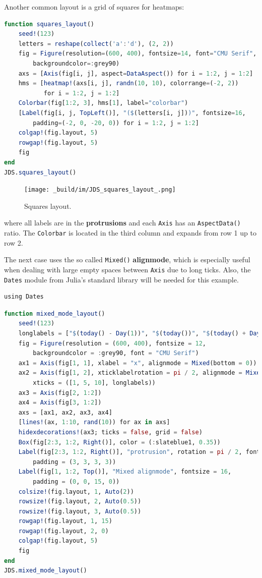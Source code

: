 \documentclass[
  notoc %
]{tufte-book}
\newcommand{\passthrough}[1]{#1}
\begin{document}
Another common layout is a grid of squares for heatmaps:

\begin{lstlisting}[language=Julia]
function squares_layout()
    seed!(123)
    letters = reshape(collect('a':'d'), (2, 2))
    fig = Figure(resolution=(600, 400), fontsize=14, font="CMU Serif",
        backgroundcolor=:grey90)
    axs = [Axis(fig[i, j], aspect=DataAspect()) for i = 1:2, j = 1:2]
    hms = [heatmap!(axs[i, j], randn(10, 10), colorrange=(-2, 2))
           for i = 1:2, j = 1:2]
    Colorbar(fig[1:2, 3], hms[1], label="colorbar")
    [Label(fig[i, j, TopLeft()], "($(letters[i, j]))", fontsize=16,
        padding=(-2, 0, -20, 0)) for i = 1:2, j = 1:2]
    colgap!(fig.layout, 5)
    rowgap!(fig.layout, 5)
    fig
end
JDS.squares_layout()
\end{lstlisting}

\begin{figure}
\hypertarget{fig:squares_layout}{%
\centering
\texttt{[image: \_build/im/JDS\_squares\_layout\_.png]}
\caption{Squares layout.}\label{fig:squares_layout}
}
\end{figure}

where all labels are in the \textbf{protrusions} and each
\passthrough{\lstinline!Axis!} has an
\passthrough{\lstinline!AspectData()!} ratio. The
\passthrough{\lstinline!Colorbar!} is located in the third column and
expands from row 1 up to row 2.

The next case uses the so called \passthrough{\lstinline!Mixed()!}
\textbf{alignmode}, which is especially useful when dealing with large
empty spaces between \passthrough{\lstinline!Axis!} due to long ticks.
Also, the \passthrough{\lstinline!Dates!} module from Julia's standard
library will be needed for this example.

\begin{lstlisting}
using Dates
\end{lstlisting}

\begin{lstlisting}[language=Julia]
function mixed_mode_layout()
    seed!(123)
    longlabels = ["$(today() - Day(1))", "$(today())", "$(today() + Day(1))"]
    fig = Figure(resolution = (600, 400), fontsize = 12,
        backgroundcolor = :grey90, font = "CMU Serif")
    ax1 = Axis(fig[1, 1], xlabel = "x", alignmode = Mixed(bottom = 0))
    ax2 = Axis(fig[1, 2], xticklabelrotation = pi / 2, alignmode = Mixed(bottom = 0),
        xticks = ([1, 5, 10], longlabels))
    ax3 = Axis(fig[2, 1:2])
    ax4 = Axis(fig[3, 1:2])
    axs = [ax1, ax2, ax3, ax4]
    [lines!(ax, 1:10, rand(10)) for ax in axs]
    hidexdecorations!(ax3; ticks = false, grid = false)
    Box(fig[2:3, 1:2, Right()], color = (:slateblue1, 0.35))
    Label(fig[2:3, 1:2, Right()], "protrusion", rotation = pi / 2, fontsize = 14,
        padding = (3, 3, 3, 3))
    Label(fig[1, 1:2, Top()], "Mixed alignmode", fontsize = 16,
        padding = (0, 0, 15, 0))
    colsize!(fig.layout, 1, Auto(2))
    rowsize!(fig.layout, 2, Auto(0.5))
    rowsize!(fig.layout, 3, Auto(0.5))
    rowgap!(fig.layout, 1, 15)
    rowgap!(fig.layout, 2, 0)
    colgap!(fig.layout, 5)
    fig
end
JDS.mixed_mode_layout()
\end{lstlisting}
\end{document}
